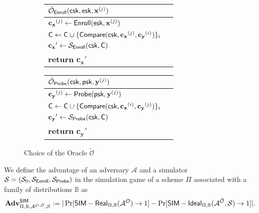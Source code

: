 \begin{figure}[h]
	\begin{center}

		\begin{subfigure}[t]{0.49\textwidth}
		\begin{tabular}{l c}
			${\mathcal{ \tilde O}}_{\sf Enroll}({\sf csk}, {\sf esk}, \mathbf{x}^{(j)})$\\

			\hline

			$\mathbf{c_x}^{(j)} \gets {\sf Enroll}({\sf esk}, \mathbf{x}^{(j)})$ \\

			${\sf C} \gets {\sf C} \cup \{ {\sf Compare}({\sf csk}, \mathbf{c_x}^{(j)}, \mathbf{c_y}^{(i)}) \}_{i}$ \\

			$\mathbf{c_x}' \gets \mathcal{S}_{\sf Enroll}({\sf csk}, {\sf C} )$ \\
			
			\textbf{return} $\mathbf{c_x}'$
			
		\end{tabular}
		\end{subfigure}
		\begin{subfigure}[t]{0.49\textwidth}
		\begin{tabular}{l c}
			$\tilde{\mathcal{O}}_{\sf Probe}({\sf csk}, {\sf psk}, \mathbf{y}^{(j)})$\\

			\hline

			$\mathbf{c_y}^{(j)} \gets {\sf Probe}( {\sf psk}, \mathbf{y}^{(j)} ) $ \\

			${\sf C} \gets {\sf C} \cup \{ {\sf Compare}({\sf csk}, \mathbf{c_x}^{(i)}, \mathbf{c_y}^{(j)}) \}_{i}$ \\

			$\mathbf{c_y}' \gets \mathcal{S}_{\sf Probe}({\sf csk}, {\sf C} )$ \\

			\textbf{return} $\mathbf{c_y}'$
			
		\end{tabular}
		\end{subfigure}
	\end{center}
	\caption{Choice of the Oracle $\tilde{\mathcal{O}}$}
	\label{fig:sim_game_oracle}
\end{figure}


We define the advantage of an adversary $\mathcal{A}$ and a simulator $\mathcal{S} = (\mathcal{S}_0, \mathcal{S}_{\sf Enroll}, \mathcal{S}_{\sf Probe})$ in the simulation game of a scheme $\Pi$ associated with a family of distributions $\mathbb{B}$ as
\[
	\mathbf{Adv}^{\sf SIM}_{\Pi, \mathbb{B}, \mathcal{A}^{\mathcal{O}, \tilde{\mathcal{O}}}, \mathcal{S}} := |\Pr[{\sf SIM-Real}_{\Pi, \mathbb{B}}(\mathcal{A}^\mathcal{O}) \to 1] - \Pr[{\sf SIM-Ideal}_{\Pi, \mathbb{B}}(\mathcal{A}^{\tilde{\mathcal{O}}}, \mathcal{S}) \to 1]|.
\]

